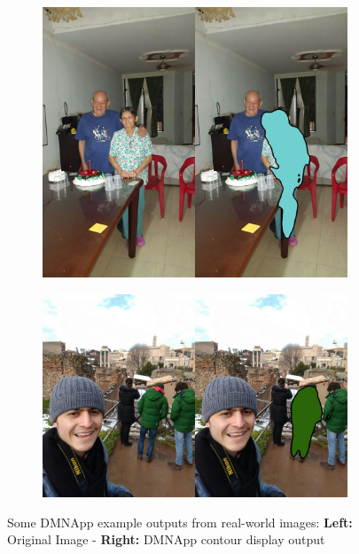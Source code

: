 \begin{figure}[!htbp]
\begin{multicols}{2}
    \begin{subfigure}[b]{\columnwidth}
            \centering
            \includegraphics[width=\textwidth]{./figures/dmn_app/samples/7.png}
    \end{subfigure}
    \begin{subfigure}[b]{\columnwidth}
            \centering
            \includegraphics[width=\textwidth]{./figures/dmn_app/samples/2.jpg}
    \end{subfigure}
    \end{multicols}
    \caption{Some DMNApp example outputs from real-world images: \textbf{Left:} Original Image - \textbf{Right:} DMNApp contour display output}
    \label{Fig:App_Examples}
\end{figure}


